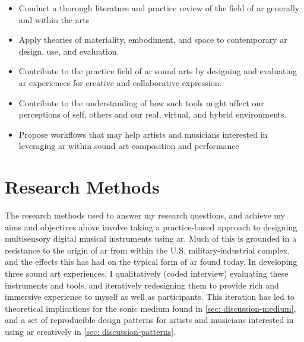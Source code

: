 \begin{itemize}
    \item Conduct a thorough literature and practice review of the field of \gls{ar} generally and within the arts
    \item Apply theories of materiality, embodiment, and space to contemporary \gls{ar} design, use, and evaluation.
    \item Contribute to the practice field of \gls{ar} sound arts by designing and evaluating \gls{ar} experiences for creative and collaborative expression.
    \item Contribute to the understanding of how such tools might affect our perceptions of self, others and our real, virtual, and hybrid environments. 
    \item Propose workflows that may help artists and musicians interested in leveraging \gls{ar} within sound art composition and performance
\end{itemize}



\section{Research Methods}\label{sec: introduction-methods}
The research methods used to answer my research questions, and achieve my aims and objectives above involve taking a practice-based approach to designing multisensory digital musical instruments using \gls{ar}. Much of this is grounded in a resistance to the origin of \gls{ar} from within the U.S. military-industrial complex, and the effects this has had on the typical form of \gls{ar} found today. In developing three sound \gls{art} experiences, I qualitatively (coded interview) evaluating these instruments and tools, and iteratively redesigning them to provide rich and immersive experience to myself as well as participants. This iteration has led to theoretical implications for the sonic medium found in \autoref{sec: discussion-medium}, and a set of reproducible design patterns for artists and musicians interested in using \gls{ar} creatively in \autoref{sec: discussion-patterns}.




